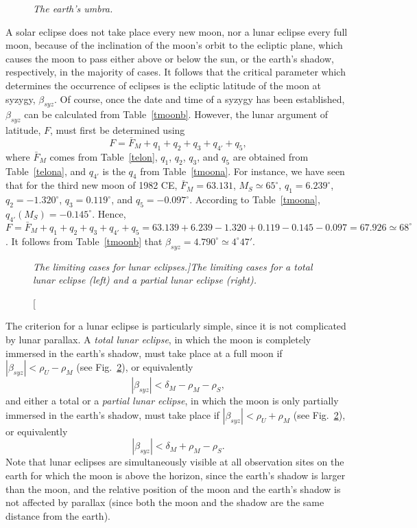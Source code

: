 \begin{figure}
\epsfysize=2.5in
\centerline{}
\caption{\em The earth's umbra.}\label{fumbra}
\end{figure}

A solar eclipse does not take place every new moon,
nor a lunar eclipse every full moon, because of the inclination of the
moon's orbit to the ecliptic plane, which causes the moon to
pass either above or below the sun, or the earth's shadow, respectively, in the majority of cases. It follows
that the critical parameter which determines the occurrence of eclipses is
the ecliptic latitude of the moon at syzygy, $\beta_{syz}$. Of course, once
the date  and time of a syzygy has been established, $\beta_{syz}$
can be calculated from Table~\ref{tmoonb}. However, the lunar argument of latitude, $F$, must first be determined using
\begin{equation}\label{moonla}
F = \bar{F}_M + q_1+q_2+q_3+q_{4'}+q_5,
\end{equation}
where $\bar{F}_M$ comes from Table~\ref{telon}, $q_1$, $q_2$, $q_3$, and $q_5$ are obtained from Table~\ref{telona},
and $q_{4'}$ is the $q_4$ from Table~\ref{tmoona}. For instance, we
have seen that for the third new moon of 1982 CE, $\bar{F}_M=63.131$, $M_S\simeq 65^\circ$, $q_1=6.239^\circ$, $q_2=-1.320^\circ$, $q_3=0.119^\circ$, and $q_5=-0.097^\circ$. According to Table~\ref{tmoona}, $q_{4'}(M_S) = -0.145^\circ$. Hence, $F =  \bar{F}_M + q_1+q_2+q_3+q_{4'}+q_5
=63.139+6.239-1.320+0.119-0.145-0.097=67.926\simeq 68^\circ$. 
It follows from Table~\ref{tmoonb} that $\beta_{syz} = 4.790^\circ\simeq 4^\circ 47'$. 

\begin{figure}
\epsfysize=2.5in
\centerline{}
\caption[\em The limiting cases for lunar eclipses.]{\em The limiting cases for a total lunar eclipse (left) and a partial lunar eclipse (right).}\label{fmoonec}
\end{figure}

The criterion for
a lunar eclipse is particularly simple, since it is not
complicated by lunar parallax. A {\em total lunar eclipse}, in which the moon is
completely immersed in the earth's shadow, must take place at a
full moon if $|\beta_{syz}| < \rho_U-\rho_M$ (see Fig.~\ref{fmoonec}),
or equivalently
\begin{equation}
|\beta_{syz}| < \delta_M-\rho_M-\rho_S,
\end{equation}
and either a total or a {\em partial lunar eclipse}, in which the moon is only
partially immersed in the earth's shadow, must take place if
$ |\beta_{syz}| < \rho_U+\rho_M$ (see Fig.~\ref{fmoonec}),
or  equivalently
\begin{equation}
|\beta_{syz}| < \delta_M+\rho_M-\rho_S.
\end{equation}
 Note that lunar eclipses are simultaneously
visible at all observation sites on the earth for which the moon is
above the horizon, since the earth's shadow is larger than the moon, and the relative position of the moon and the earth's shadow is not affected by parallax
(since both the moon and the shadow are the same distance from the earth).

